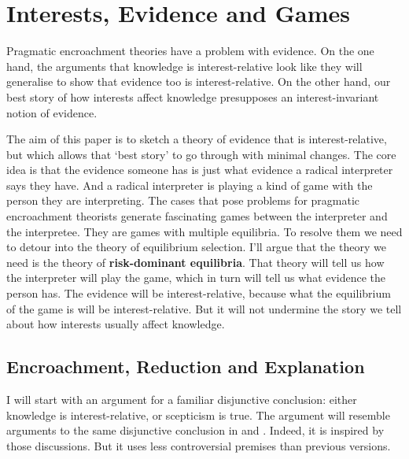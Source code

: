 \chapter{Interests, Evidence and Games}


Pragmatic encroachment theories have a problem with evidence. On the one hand, the arguments that knowledge is interest-relative look like they will generalise to show that evidence too is interest-relative. On the other hand, our best story of how interests affect knowledge presupposes an interest-invariant notion of evidence.

The aim of this paper is to sketch a theory of evidence that is interest-relative, but which allows that `best story' to go through with minimal changes. The core idea is that the evidence someone has is just what evidence a radical interpreter says they have. And a radical interpreter is playing a kind of game with the person they are interpreting. The cases that pose problems for pragmatic encroachment theorists generate fascinating games between the interpreter and the interpretee. They are games with multiple equilibria. To resolve them we need to detour into the theory of equilibrium selection. I'll argue that the theory we need is the theory of \textbf{risk-dominant equilibria}. That theory will tell us how the interpreter will play the game, which in turn will tell us what evidence the person has. The evidence will be interest-relative, because what the equilibrium of the game is will be interest-relative. But it will not undermine the story we tell about how interests usually affect knowledge.

\section{Encroachment, Reduction and Explanation}
\label{encroachmentreductionandexplanation}

I will start with an argument for a familiar disjunctive conclusion: either knowledge is interest-relative, or scepticism is true. The argument will resemble arguments to the same disjunctive conclusion in \citet{Hawthorne2004} and \citet{FantlMcGrath2009}. Indeed, it is inspired by those discussions. But it uses less controversial premises than previous versions.

